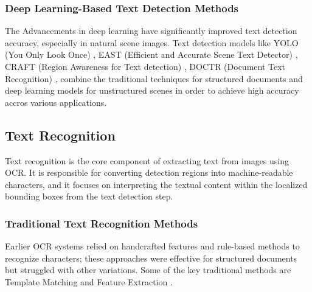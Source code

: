 \subsubsection{Deep Learning-Based Text Detection Methods}
The Advancements in deep learning have significantly improved text detection accuracy, especially in natural scene images. Text detection models like YOLO (You Only Look Once) \cite{redmon2016you}, EAST (Efficient and Accurate Scene Text Detector)  \cite{zhou2017east}, CRAFT (Region Awareness for Text detection)  \cite{baek2019character}, DOCTR (Document Text Recognition) \cite{mindee2021doctr}, combine the traditional techniques for structured documents and deep learning models for unstructured scenes in order to achieve high accuracy accros various applications\cite{zhou2017east,
baek2019character}.%

\subsection{Text Recognition}
Text recognition is the core component of extracting text from images using OCR. It is responsible for converting detection regions into machine-readable characters, and it focuses on interpreting the textual content within the localized bounding boxes from the text detection step.%

\subsubsection{Traditional Text Recognition Methods}
Earlier OCR systems relied on handcrafted features and rule-based methods to recognize characters; these approaches were effective for structured documents but struggled with other variations. Some of the key traditional methods are Template Matching and Feature Extraction \cite{casey1996survey}. %


